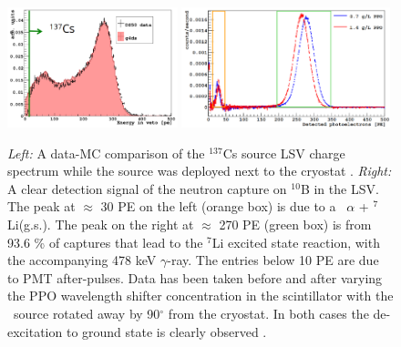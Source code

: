 \begin{figure}[htbp]
\centering
\includegraphics[width=0.44\textwidth]{./Figures/137Cs_Veto_Paolo_G4DS_UCLA}
\includegraphics[width=0.54\textwidth]{./Figures/AmBe_LSV_VetoPaper}
\caption{\textit{Left:} A data-MC comparison of the $^{137}$Cs source LSV charge spectrum while the source was deployed next to the cryostat \cite{DS50:G4DS:paper}.
\textit{Right:} A clear detection signal of the neutron capture on $^{10}$B in the LSV. The peak at $\approx$ 30 PE on the left (orange box) is due to a \enbortengroundalpha\ $\alpha$ + $^7$Li(g.s.). The peak on the right at $\approx$ 270 PE (green box) is from 93.6 \% of captures that lead to the $^7$Li excited state reaction, with the accompanying 478 keV $\gamma$-ray. The entries below 10 PE are due to PMT after-pulses. Data has been taken before and after varying the PPO wavelength shifter concentration in the scintillator with the \AmBe\ source rotated away by 90$^{\circ}$ from the cryostat. In both cases the de-excitation to ground state is clearly observed \cite{Agnes:2015qyz}.
\label{fig:LSV:Calib}} 
\end{figure}